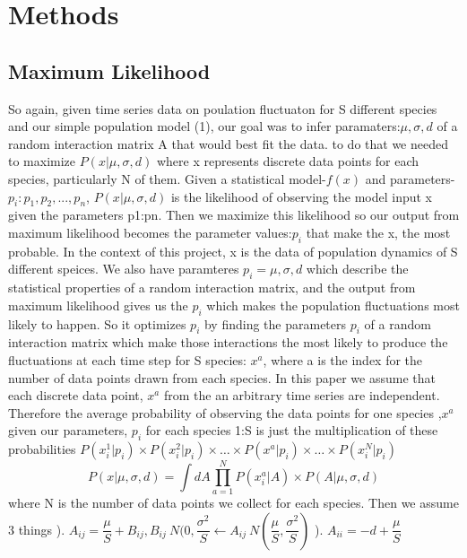 \documentclass{article}
\begin{document}
\section{Methods}
\subsection{Maximum Likelihood}
\hfill\break
So again, given time series data on poulation fluctuaton for S different species and our simple population model (1), our goal was to infer paramaters:$\mu,\sigma,d$ of a random interaction matrix A that would best fit the data. to do that we needed to maximize $P(x|\mu,\sigma,d)$ where x represents discrete data points for each species, particularly N of them. Given a statistical model-$f(x)$ and parameters-$p_i:p_1,p_2,...,p_n$,  $P(x|\mu,\sigma,d)$ is the likelihood of observing the model input x given the parameters p1:pn. Then we maximize this likelihood so our output from maximum likelihood becomes the parameter values:$p_i$ that make the x, the most probable. In the context of this project, x is the data of population dynamics of S different speices. We also have paramteres $p_i={\mu,\sigma,d}$ which describe the statistical properties of a random interaction matrix, and the output from maximum likelihood gives us the $p_i$ which makes the population fluctuations most likely to happen. So it optimizes $p_i$ by finding the parameters $p_i$ of a random interaction matrix which make those interactions the most likely to produce the fluctuations at each time step for S species: $x^a$, where a is the index for the number of data points drawn from each species.
\hfill\break\hfill\break
In this paper we assume that each discrete data point, $x^a$ from the an arbitrary time series are independent. Therefore the average probability of observing the data points for one species ,$x^a$ given our parameters, $p_i$ for each species 1:S is just the multiplication of these probabilities \hfill\break\hfill\break $P(x_i^1|p_i)\times P(x_i^2|p_i) \times \dots \times P(x^a|p_i)\times \dots \times P(x_i^N|p_i)$
\begin{equation}
P(x|\mu,\sigma,d)=\int dA \prod_{a=1}^N P(x_i^a|A)\times P(A|\mu,\sigma,d)
\end{equation}
\hfill\break where N is the number of data points we collect for each species.
\hfill\break\hfill\break Then we assume 3 things
\hfill\break\hfill{}). $A_{ij}=\dfrac{\mu}{S} + B_{ij}, B_{ij}~N(0,\dfrac{\sigma^2}{S}\leftarrow A_{ij}~N(\dfrac{\mu}{S},\dfrac{\sigma^2}{S})$ \hfill{}). $A_{ii}=-d+\dfrac{\mu}{S}$ \hfill\break
\end{document}
